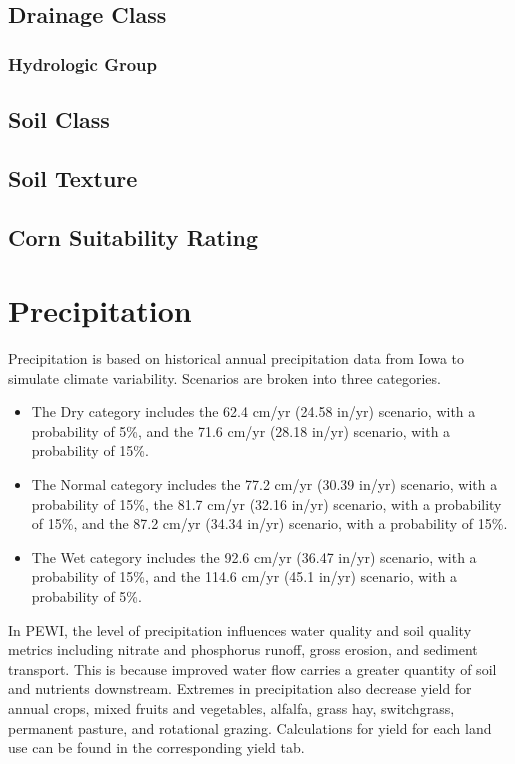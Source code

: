 \documentclass[11pt]{article}
\begin{document}
\subsection{Drainage Class}

\subsubsection{Hydrologic Group}

\subsection{Soil Class}

\subsection{Soil Texture}

\subsection{Corn Suitability Rating}


\newpage
\section{Precipitation}
Precipitation is based on historical annual precipitation data from Iowa to simulate climate variability. Scenarios are broken into three categories. 
\begin{itemize}
  \item The Dry category includes the 62.4 cm/yr (24.58 in/yr) scenario, with a probability of 5\%, and the 71.6 cm/yr (28.18 in/yr) scenario, with a probability of 15\%. 
  \item The Normal category includes the 77.2 cm/yr (30.39 in/yr) scenario, with a probability of 15\%, the 81.7 cm/yr (32.16 in/yr) scenario, with a probability of 15\%, and the 87.2 cm/yr (34.34 in/yr) scenario, with a probability of 15\%.
  \item The Wet category includes the 92.6 cm/yr (36.47 in/yr) scenario, with a probability of 15\%, and the 114.6 cm/yr (45.1 in/yr) scenario, with a probability of 5\%.
\end{itemize}

In PEWI, the level of precipitation influences water quality and soil quality metrics including nitrate and phosphorus runoff, gross erosion, and sediment transport. This is because improved water flow carries a greater quantity of soil and nutrients downstream. Extremes in precipitation also decrease yield for annual crops, mixed fruits and vegetables, alfalfa, grass hay, switchgrass, permanent pasture, and rotational grazing.\cite{33}  Calculations for yield for each land use can be found in the corresponding yield tab.
\end{document}
